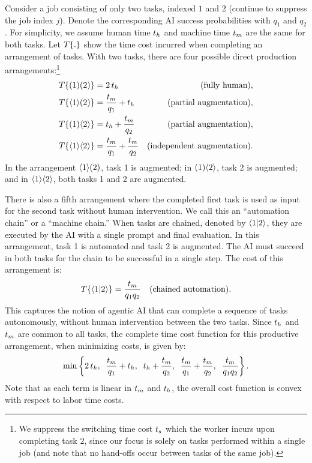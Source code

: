 \documentclass{article}
\theoremstyle{plain}
\theoremstyle{plain}
\begin{document}
Consider a job consisting of only two tasks, indexed $1$ and $2$ (continue to suppress the job index $j$).
Denote the corresponding AI success probabilities with \(q_1\) and \(q_2\). 
For simplicity, we assume human time \(t_{h}\) and machine time \(t_{m}\) are the same for both tasks.
Let $T\{ . \}$ show the time cost incurred when completing an arrangement of tasks.
With two tasks, there are four possible direct production arrangements:\footnote{We suppress the switching time cost $t_{s}$ which the worker incurs upon completing task $2$, since our focus is solely on tasks performed within a single job (and note that no hand-offs occur between tasks of the same job).}
\begin{align*}
    T\{ ( 1 )( 2 ) \} &= 2\,t_{h} & \text{(fully human)}, \\
    T\{ \langle 1 \rangle( 2 ) \} &= \frac{t_{m}}{q_1} + t_{h} & \text{(partial augmentation)}, \\
    T\{ ( 1 )\langle 2 \rangle \} &= t_{h} + \frac{t_{m}}{q_2} & \text{(partial augmentation)}, \\
    T\{ \langle 1 \rangle\langle 2 \rangle \} &= \frac{t_{m}}{q_1} + \frac{t_{m}}{q_2} & \text{(independent augmentation)}.
\end{align*}
In the arrangement $\langle 1 \rangle( 2 )$, task 1 is augmented; in $( 1 )\langle 2 \rangle$, task 2 is augmented; and in $\langle 1 \rangle\langle 2 \rangle$, both tasks 1 and 2 are augmented.  

There is also a fifth arrangement where the completed first task is used as input for the second task without human intervention.
We call this an ``automation chain'' or a ``machine chain.''
When tasks are chained, denoted by $\langle 1|2 \rangle$, they are executed by the AI with a single prompt and final evaluation.
In this arrangement, task 1 is automated and task 2 is augmented.
The AI must succeed in both tasks for the chain to be successful in a single step.
The cost of this arrangement is:
\begin{align*}
T\{ \langle 1|2 \rangle \} &= \frac{t_{m}}{q_1 q_2} & \text{(chained automation)}.
\end{align*}
This captures the notion of agentic AI that can complete a sequence of tasks autonomously, without human intervention between the two tasks.
Since $t_{h}$ and $t_{m}$ are common to all tasks, the complete time cost function for this productive arrangement, when minimizing costs, is given by:
\begin{align}
  \min \left\{ 2\,t_{h},\;\; \frac{t_{m}}{q_1} + t_{h},\;\; t_{h} + \frac{t_{m}}{q_2},\;\; \frac{t_{m}}{q_1} + \frac{t_{m}}{q_2},\;\; \frac{t_{m}}{q_1 q_2} \right\}.
\end{align}
Note that as each term is linear in $t_{m}$ and $t_{h}$, the overall cost function is convex with respect to labor time costs.
\end{document}
